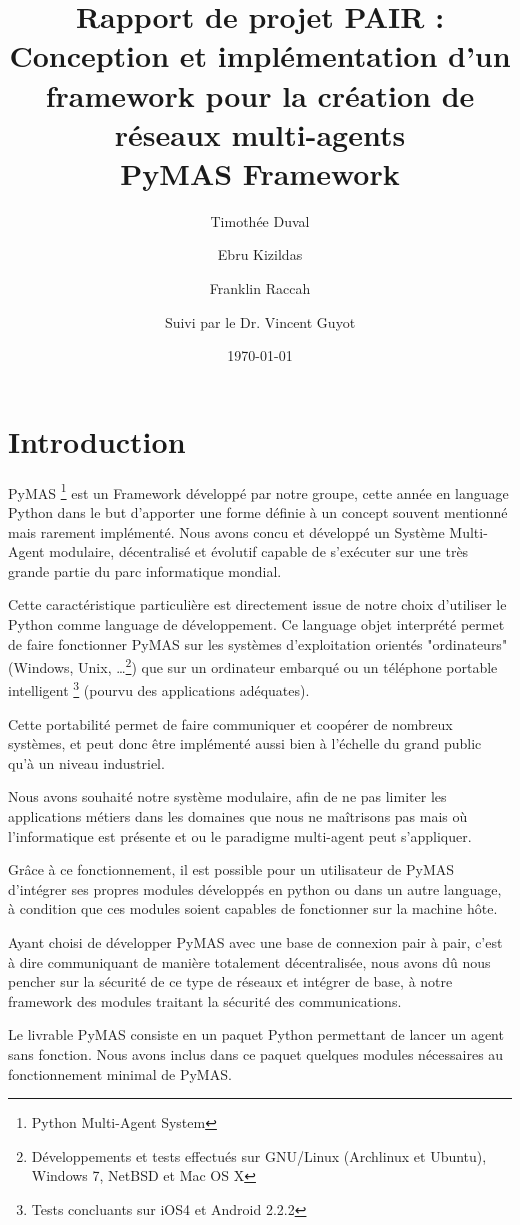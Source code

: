 \documentclass[11pt]{book}
\title{Rapport de projet PAIR : Conception et implémentation d'un framework 
pour la création de réseaux multi-agents\\
PyMAS Framework}
\author{Timothée Duval \and Ebru Kizildas \and Franklin Raccah \\
\and Suivi par le Dr. Vincent Guyot}
\date\today
\begin{document}
\maketitle
\tableofcontents

\chapter*{Introduction}
PyMAS \footnote{Python Multi-Agent System} est un Framework développé par 
notre groupe, cette année en language Python dans le but d’apporter une 
forme définie à un concept souvent mentionné mais rarement implémenté. Nous 
avons concu et développé un Système Multi-Agent modulaire, décentralisé et 
évolutif capable de s'exécuter sur une très grande partie du parc 
informatique mondial.

Cette caractéristique particulière est directement issue de notre choix 
d'utiliser le Python comme language de développement. Ce language objet 
interprété permet de faire fonctionner PyMAS sur les systèmes d'exploitation 
orientés "ordinateurs" (Windows, Unix, \dots \footnote{Développements et 
tests effectués sur GNU/Linux (Archlinux et Ubuntu), Windows 7, NetBSD 
et Mac OS X}) que sur un ordinateur embarqué ou un téléphone portable 
intelligent \footnote{Tests concluants sur iOS4 et Android 2.2.2} (pourvu des 
applications adéquates).

Cette portabilité permet de faire communiquer et coopérer de nombreux 
systèmes, et peut donc être implémenté aussi bien à l’échelle du grand 
public qu'à un niveau industriel.

Nous avons souhaité notre système modulaire, afin de ne pas limiter les
applications métiers dans les domaines que nous ne maîtrisons pas mais où 
l’informatique est présente et ou le paradigme multi-agent peut s'appliquer. 

Grâce à ce fonctionnement, il est possible pour un utilisateur de PyMAS 
d’intégrer ses propres modules développés en python ou dans un autre 
language, à condition que ces modules soient capables de fonctionner sur 
la machine hôte.

Ayant choisi de développer PyMAS avec une base de connexion pair à pair, 
c’est à dire communiquant de manière totalement décentralisée, nous avons 
dû nous pencher sur la sécurité de ce type de réseaux et intégrer de base, 
à notre framework des modules traitant la sécurité des communications.

Le livrable PyMAS consiste en un paquet Python permettant de lancer un agent 
sans fonction. Nous avons inclus dans ce paquet quelques modules nécessaires 
au fonctionnement minimal de PyMAS.
\end{document}
